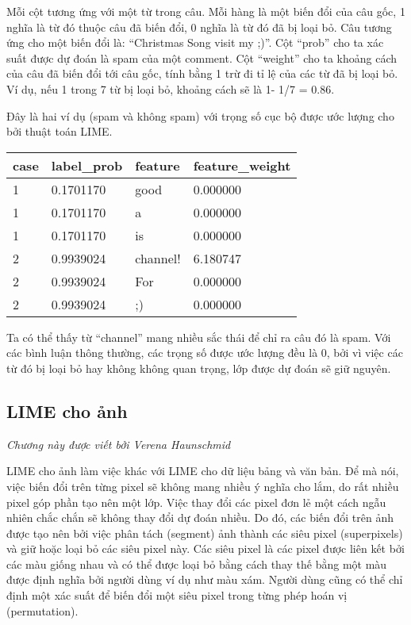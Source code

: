 Mỗi cột tương ứng với một từ trong câu. Mỗi hàng là một biến đổi của câu gốc, 1 nghĩa là từ đó thuộc câu đã biến đổi, 0 nghĩa là từ đó đã bị loại bỏ. Câu tương ứng cho một biến đổi là: ``Christmas Song visit my ;)''. Cột ``prob'' cho ta xác suất được dự đoán là spam của một comment. Cột ``weight'' cho ta khoảng cách của câu đã biến đổi tới câu gốc, tính bằng 1 trừ đi tỉ lệ của các từ đã bị loại bỏ. Ví dụ, nếu 1 trong 7 từ bị loại bỏ, khoảng cách sẽ là 1- 1/7 = 0.86.

Đây là hai ví dụ (spam và không spam) với trọng số cục bộ được ước lượng cho bởi thuật toán LIME.
\begin{table}[hbt!]
\centering
\label{tab:my-table}
\begin{tabular}{|l|l|l|l|}
\hline
\textbf{case} & \textbf{label\_prob} & \textbf{feature} & \textbf{feature\_weight} \\ \hline
1             & 0.1701170            & good             & 0.000000                 \\ \hline
1             & 0.1701170            & a                & 0.000000                 \\ \hline
1             & 0.1701170            & is               & 0.000000                 \\ \hline
2             & 0.9939024            & channel!         & 6.180747                 \\ \hline
2             & 0.9939024            & For              & 0.000000                 \\ \hline
2             & 0.9939024            & ;)               & 0.000000                 \\ \hline
\end{tabular}
\end{table}

Ta có thể thấy từ ``channel'' mang nhiều sắc thái để chỉ ra câu đó là spam. Với các bình luận thông thường, các trọng số được ước lượng đều là 0, bởi vì việc các từ đó bị loại bỏ hay không không quan trọng, lớp được dự đoán sẽ giữ nguyên.

\subsection{LIME cho ảnh}
\textit{Chương này được viết bởi Verena Haunschmid}

LIME cho ảnh làm việc khác với LIME cho dữ liệu bảng và văn bản. Để mà nói, việc biến đổi trên từng pixel sẽ không mang nhiều ý nghĩa cho lắm, do rất nhiều pixel góp phần tạo nên một lớp. Việc thay đổi các pixel đơn lẻ một cách ngẫu nhiên chắc chắn sẽ không thay đổi dự đoán nhiều. Do đó, các biến đổi trên ảnh được tạo nên bởi việc phân tách (segment) ảnh thành các siêu pixel (superpixels) và giữ hoặc loại bỏ các siêu pixel này. Các siêu pixel là các pixel được liên kết bởi các màu giống nhau và có thể được loại bỏ bằng cách thay thế bằng một màu được định nghĩa bởi người dùng ví dụ như màu xám. Người dùng cũng có thể chỉ định một xác suất để biến đổi một siêu pixel trong từng phép hoán vị (permutation).

